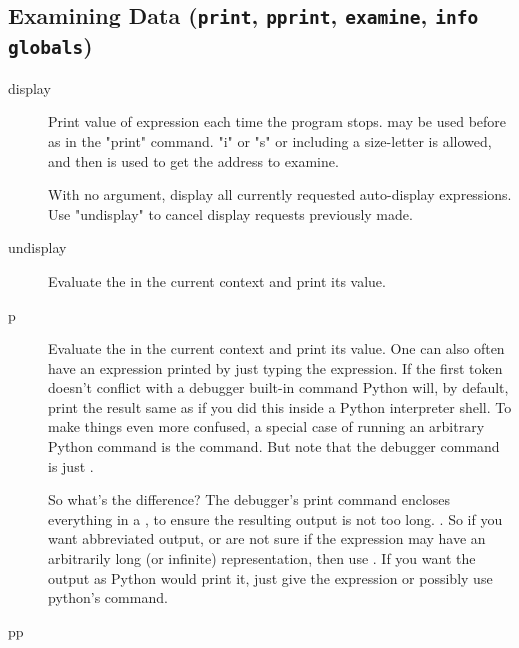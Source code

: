 \subsection{Examining Data ({\tt print}, {\tt pprint}, {\tt examine}, {\tt info globals})\label{subsection-data}}

\begin{description}

\item[display  ]

Print value of expression  each time the program
stops.   may be used before  as in the
"print" command.   "i" or "s" or including a size-letter
is allowed, and then  is used to get the address to
examine.

With no argument, display all currently requested auto-display
expressions.  Use "undisplay" to cancel display requests previously
made.

\item[undisplay  ]

Evaluate the  in the current context and print its
value.  


\item[p ]

Evaluate the  in the current context and print its
value. One can also often have an expression printed by just typing
the expression. If the first token doesn't conflict with a debugger
built-in command Python will, by default, print the result same as if
you did this inside a Python interpreter shell. To make things even
more confused, a special case of running an arbitrary Python command
is the  command. But note that the debugger command is
just .

So what's the difference? The debugger's print command encloses
everything in a , to ensure the resulting output is not
too long.  \emph{}. So if you want abbreviated output, or are not
sure if the expression may have an arbitrarily long (or infinite)
representation, then use . If you want the output as Python
would print it, just give the expression or possibly use python's
 command.

\item[pp ]


\end{description}
